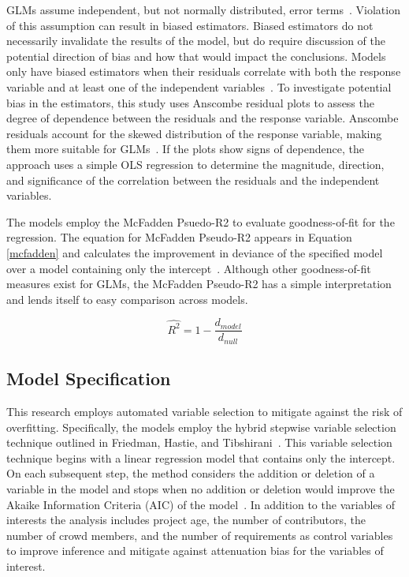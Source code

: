 GLMs assume independent, but not normally distributed, error terms~\cite{fahrmeir}. Violation of this assumption can result in biased estimators. Biased estimators do not necessarily invalidate the results of the model, but do require discussion of the potential direction of bias and how that would impact the conclusions. Models only have biased estimators when their residuals correlate with both the response variable and at least one of the independent variables~\cite{wooldridge}. To investigate potential bias in the estimators, this study uses Anscombe residual plots to assess the degree of dependence between the residuals and the response variable. Anscombe residuals account for the skewed distribution of the response variable, making them more suitable for GLMs~\cite{anscombe}. If the plots show signs of dependence, the approach uses a simple OLS regression to determine the magnitude, direction, and significance of the correlation between the residuals and the independent variables.

The models employ the McFadden Psuedo-R2 to evaluate goodness-of-fit for the regression. The equation for McFadden Pseudo-R2 appears in Equation \ref{mcfadden} and calculates the improvement in deviance of the specified model over a model containing only the intercept~\cite{veall}. Although other goodness-of-fit measures exist for GLMs, the McFadden Pseudo-R2 has a simple interpretation and lends itself to easy comparison across models.

\begin{equation}
\label{mcfadden}
    \hat{R^2} = 1 - \frac{d_{model}}{d_{null}}
\end{equation}

\subsection{Model Specification}

This research employs automated variable selection to mitigate against the risk of overfitting. Specifically, the models employ the hybrid stepwise variable selection technique outlined in Friedman, Hastie, and Tibshirani~\cite{friedman, derkson}. This variable selection technique begins with a linear regression model that contains only the intercept. On each subsequent step, the method considers the addition or deletion of a variable in the model and stops when no addition or deletion would improve the Akaike Information Criteria (AIC) of the model~\cite{friedman}. In addition to the variables of interests the analysis includes project age, the number of contributors, the number of crowd members, and the number of requirements as control variables to improve inference and mitigate against attenuation bias for the variables of interest.

